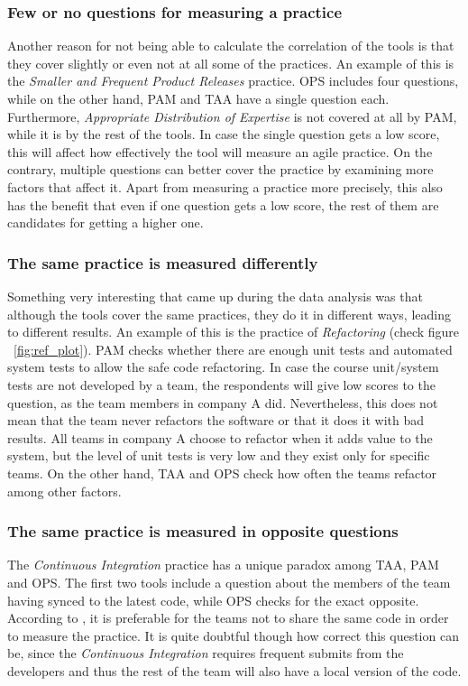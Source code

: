 \subsubsection{Few or no questions for measuring a practice}
Another reason for not being able to calculate the correlation of the tools is that they cover slightly or even not at all some of the practices. An example of this is the \textit{Smaller and Frequent Product Releases} practice. \ac{OPS} includes four questions, while on the other hand, \ac{PAM} and \ac{TAA} have a single question each. Furthermore, \textit{Appropriate Distribution of Expertise} is not covered at all by \ac{PAM}, while it is by the rest of the tools. In case the single question gets a low score, this will affect how effectively the tool will measure an agile practice. On the contrary, multiple questions can better cover the practice by examining more factors that affect it. Apart from measuring a practice more precisely, this also has the benefit that even if one question gets a low score, the rest of them are candidates for getting a higher one.

\subsubsection{The same practice is measured differently}
Something very interesting that came up during the data analysis was that although the tools cover the same practices, they do it in different ways, leading to different results. An example of this is the practice of \textit{Refactoring} (check figure ~\ref{fig:ref_plot}). \ac{PAM} checks whether there are enough unit tests and automated system tests to allow the safe code refactoring. In case the course unit/system tests are not developed by a team, the respondents will give low scores to the question, as the team members in company A did. Nevertheless, this does not mean that the team never refactors the software or that it does it with bad results. All teams in company A choose to refactor when it adds value to the system, but the level of unit tests is very low and they exist only for specific teams. On the other hand, \ac{TAA} and \ac{OPS} check how often the teams refactor among other factors.

\subsubsection{The same practice is measured in opposite questions}
\label{subsec:opposite_questions}
The \textit{Continuous Integration} practice has a unique paradox among \ac{TAA}, \ac{PAM} and \ac{OPS}. The first two tools include a question about the members of the team having synced to the latest code, while \ac{OPS} checks for the exact opposite. According to \citet{sventha_dissertation}, it is preferable for the teams not to share the same code in order to measure the practice. It is quite doubtful though how correct this question can be, since the \textit{Continuous Integration} requires frequent submits from the developers and thus the rest of the team will also have a local version of the code.

